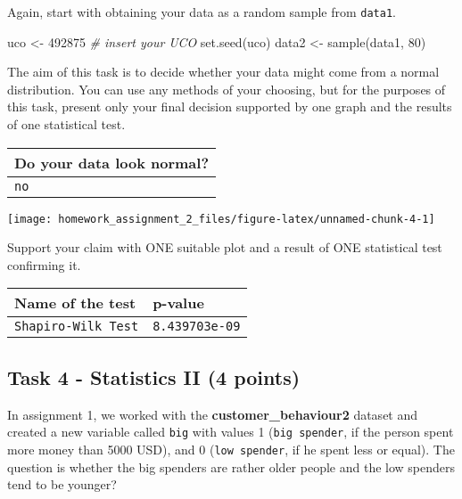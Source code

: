 \documentclass[
]{article}
\newenvironment{Shaded}{\begin{snugshade}}{\end{snugshade}}
\newcommand{\CommentTok}[1]{\textcolor[rgb]{0.56,0.35,0.01}{\textit{#1}}}
\newcommand{\DecValTok}[1]{\textcolor[rgb]{0.00,0.00,0.81}{#1}}
\newcommand{\FunctionTok}[1]{\textcolor[rgb]{0.00,0.00,0.00}{#1}}
\newcommand{\NormalTok}[1]{#1}
\newcommand{\OtherTok}[1]{\textcolor[rgb]{0.56,0.35,0.01}{#1}}
\begin{document}
Again, start with obtaining your data as a random sample from
\texttt{data1}.

\begin{Shaded}
\begin{Highlighting}[]
\NormalTok{uco }\OtherTok{\textless{}{-}} \DecValTok{492875}  \CommentTok{\# insert your UCO}
\FunctionTok{set.seed}\NormalTok{(uco)}
\NormalTok{data2 }\OtherTok{\textless{}{-}} \FunctionTok{sample}\NormalTok{(data1, }\DecValTok{80}\NormalTok{)}
\end{Highlighting}
\end{Shaded}

The aim of this task is to decide whether your data might come from a
normal distribution. You can use any methods of your choosing, but for
the purposes of this task, present only your final decision supported by
one graph and the results of one statistical test.

\begin{longtable}[]{@{}l@{}}
\toprule()
Do your data look normal? \\
\midrule()
\endhead
\texttt{no} \\
\bottomrule()
\end{longtable}

\texttt{[image: homework\_assignment\_2\_files/figure-latex/unnamed-chunk-4-1]}

Support your claim with ONE suitable plot and a result of ONE
statistical test confirming it.

\begin{longtable}[]{@{}ll@{}}
\toprule()
Name of the test & p-value \\
\midrule()
\endhead
\texttt{Shapiro-Wilk\ Test} & \texttt{8.439703e-09} \\
\bottomrule()
\end{longtable}

\hypertarget{task-4---statistics-ii-4-points}{%
\subsection{Task 4 - Statistics II (4
points)}\label{task-4---statistics-ii-4-points}}

In assignment 1, we worked with the \textbf{customer\_behaviour2}
dataset and created a new variable called \texttt{big} with values 1
(\texttt{big\ spender}, if the person spent more money than 5000 USD),
and 0 (\texttt{low\ spender}, if he spent less or equal). The question
is whether the big spenders are rather older people and the low spenders
tend to be younger?
\end{document}
